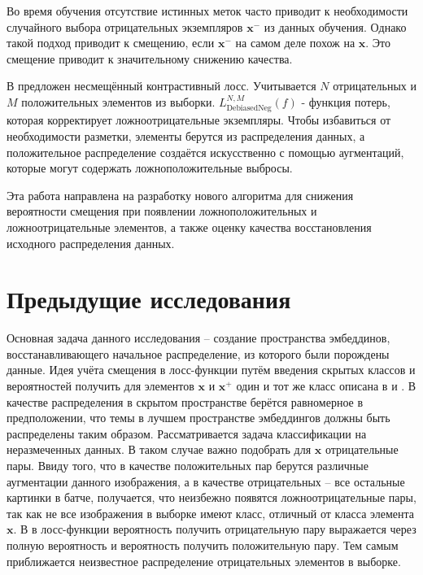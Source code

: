 \documentclass[a4paper, 14pt]{article}
\begin{document}
Во время обучения отсутствие истинных меток часто приводит к необходимости случайного выбора отрицательных экземпляров $\mathbf{x}^-$ из данных обучения. Однако такой подход приводит к смещению, если $\mathbf{x}^-$ на самом деле похож на $\mathbf{x}$. Это смещение приводит к значительному снижению качества\citep{NEURIPS2021_de8aa43e}.

В \citep{chuang2020debiased} предложен несмещённый контрастивный лосс. Учитывается $N$ отрицательных и $M$ положительных элементов из выборки. $L^{N, M}_{\text{DebiasedNeg}}(f)$ - функция потерь, которая корректирует ложноотрицательные экземпляры. Чтобы избавиться от необходимости разметки, элементы берутся из распределения данных, а положительное распределение создаётся искусственно с помощью аугментаций, которые могут содержать ложноположительные выбросы.

Эта работа направлена на разработку нового алгоритма для снижения вероятности смещения при появлении ложноположительных и ложноотрицательные элементов, а также оценку качества восстановления исходного распределения данных.

\newpage
\section{Предыдущие исследования}
Основная задача данного исследования -- создание пространства эмбеддинов, восстанавливающего начальное распределение, из которого были порождены данные. Идея учёта смещения в лосс-функции путём введения скрытых классов и вероятностей получить для элементов $\textbf{x}$ и $\textbf{x}^+$ один и тот же класс описана в \citep{chuang2020debiased} и \citep{Arora2019ATA}. В качестве распределения в скрытом пространстве берётся равномерное в предположении, что темы в лучшем пространстве эмбеддингов должны быть распределены таким образом. Рассматривается задача классификации на неразмеченных данных. В таком случае важно подобрать для $\textbf{x}$ отрицательные пары. Ввиду того, что в качестве положительных пар берутся различные аугментации данного изображения, а в качестве отрицательных -- все остальные картинки в батче, получается, что неизбежно появятся ложноотрицательные пары, так как не все изображения в выборке имеют класс, отличный от класса элемента $\textbf{x}$. В \citep{chuang2020debiased} в лосс-функции вероятность получить отрицательную пару выражается через полную вероятность и вероятность получить положительную пару. Тем самым приближается неизвестное распределение отрицательных элементов в выборке.
\end{document}
